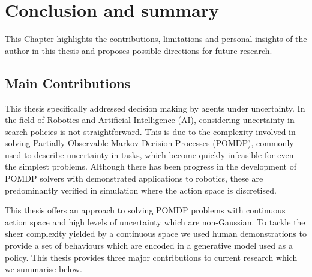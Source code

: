 \chapter{Conclusion and summary}

This Chapter highlights the contributions, limitations and personal insights of the author in this thesis and 
proposes possible directions for future research.





\section{Main Contributions}

This thesis specifically addressed decision making by agents under uncertainty. 
In the field of Robotics and Artificial Intelligence (AI), considering uncertainty in search policies is not straightforward. 
This is due to the complexity involved in solving Partially Observable Markov Decision Processes (POMDP), 
commonly used to describe uncertainty in tasks, which become quickly infeasible for even the simplest problems. 
Although there has been progress in the development of POMDP solvers with demonstrated applications to robotics, 
these are predominantly verified in simulation where the action space is discretised.  

This thesis offers an approach to solving POMDP problems with continuous action space and high levels of uncertainty which 
are non-Gaussian. To tackle the sheer complexity yielded by a continuous space we used human demonstrations to provide a 
set of behaviours which are encoded in a generative model used as a policy. This thesis provides three major contributions to 
current research which we summarise below.


